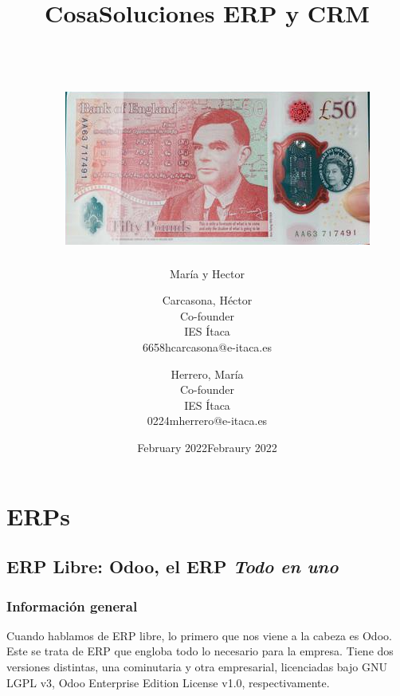 \documentclass[openany,overnay,a4paper, twoside, 12pt]{book}
\title{Cosa}
\author{María y Hector}
\date{February 2022}
\title{\textbf{Soluciones ERP y CRM} \\
\\\\\
\newline
\newline
\newline
\includegraphics[scale = 0.8]{imagenes/att.png}}
\author{
    Carcasona, Héctor\\
    Co-founder\\
    IES Ítaca\\
    6658hcarcasona@e-itaca.es
  \and
    Herrero, María\\
   Co-founder\\
    IES Ítaca\\
    0224mherrero@e-itaca.es}
\date{Febraury 2022}
\begin{document}
\let\cleardoublepage\clearpage %
\maketitle
\tableofcontents
\setcounter{chapter}{1}
\chapter*{\centering ERPs}
\section{ERP Libre: Odoo, el ERP \textit{Todo en uno}}
\subsection{Información general}
Cuando hablamos de ERP libre, lo primero que nos viene a la cabeza es Odoo. \\Este se trata de ERP que engloba todo lo necesario para la empresa. Tiene dos versiones distintas, una cominutaria y otra empresarial, licenciadas bajo GNU LGPL v3, Odoo Enterprise Edition License v1.0, respectivamente.
\\
\end{document}

